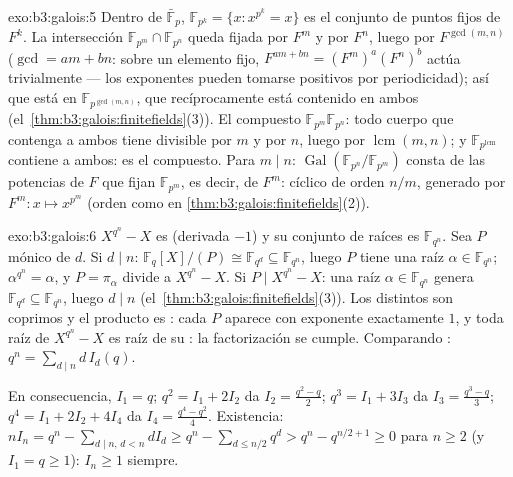 \begin{solution}{exo:b3:galois:5}
Dentro de $\bar{\mathbb F}_p$, $\mathbb F_{p^k} = \{x : x^{p^k} =
x\}$ es el conjunto de puntos fijos de $F^k$. La intersección
$\mathbb F_{p^m}
\cap \mathbb F_{p^n}$ queda fijada por $F^m$ y por $F^n$, luego por
$F^{\gcd(m,n)}$ ($\gcd = am + bn$: sobre un elemento fijo, $F^{am +
bn} = (F^m)^a(F^n)^b$ actúa trivialmente --- los exponentes pueden
tomarse positivos por periodicidad); así que está en $\mathbb
F_{p^{\gcd(m,n)}}$, que recíprocamente está contenido en ambos
(el~\cref{thm:b3:galois:finitefields}(3)). El compuesto $\mathbb
F_{p^m}\mathbb F_{p^n}$: todo cuerpo que contenga a ambos tiene
 divisible por $m$ y por $n$,
luego por $\operatorname{lcm}(m,n)$; y
$\mathbb F_{p^{\operatorname{lcm}}}$ contiene a ambos: es el compuesto.
Para $m \mid n$: $\operatorname{Gal}(\mathbb
F_{p^n}/\mathbb F_{p^m})$ consta de las potencias de $F$ que fijan
$\mathbb F_{p^m}$, es decir, de $F^m$: cíclico de orden $n/m$, generado
por $F^m \colon x \mapsto x^{p^m}$ (orden como en
\cref{thm:b3:galois:finitefields}(2)).
\end{solution}

\begin{solution}{exo:b3:galois:6}
$X^{q^n} - X$ es  (derivada
$-1$) y su conjunto de raíces es $\mathbb F_{q^n}$. Sea $P$ mónico
 de
 $d$. Si $d \mid n$:
$\mathbb F_q[X]/(P) \cong \mathbb F_{q^d}
\subseteq \mathbb F_{q^n}$, luego $P$ tiene una raíz $\alpha \in
\mathbb F_{q^n}$; $\alpha^{q^n} = \alpha$, y $P =
\pi_\alpha$ divide a $X^{q^n} - X$. Si $P \mid X^{q^n} - X$: una raíz
$\alpha \in \mathbb F_{q^n}$ genera $\mathbb F_{q^d}
\subseteq \mathbb F_{q^n}$, luego $d \mid n$
(el~\cref{thm:b3:galois:finitefields}(3)). Los
 distintos son coprimos
y el producto es : cada $P$
aparece con exponente exactamente $1$, y toda raíz de $X^{q^n}-X$ es
raíz de su : la
factorización se cumple. Comparando
:
$q^n = \sum_{d\mid n} d\,I_d(q)$.

En consecuencia, $I_1 = q$; $q^2 = I_1 + 2I_2$ da $I_2 =
\frac{q^2 - q}2$; $q^3 = I_1 + 3I_3$ da $I_3 = \frac{q^3 -
q}3$; $q^4 = I_1 + 2I_2 + 4I_4$ da $I_4 = \frac{q^4 -
q^2}4$. Existencia: $nI_n = q^n - \sum_{d \mid n,\, d < n}
dI_d \geq q^n - \sum_{d \leq n/2} q^d > q^n - q^{n/2 + 1} \geq
0$ para $n \geq 2$ (y $I_1 = q \geq 1$): $I_n \geq 1$ siempre.
\end{solution}

